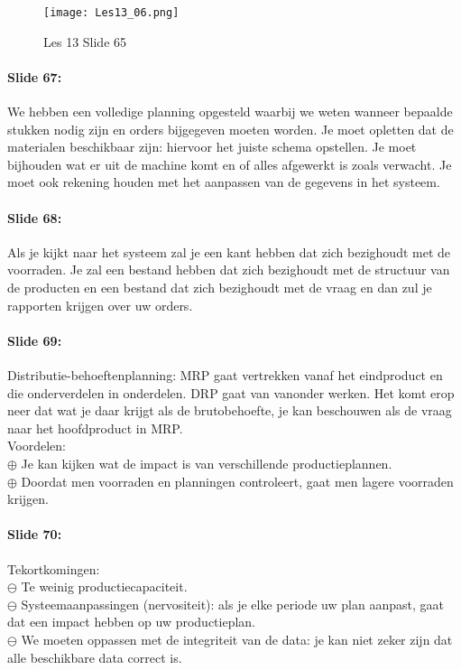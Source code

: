\documentclass[10pt,a4paper]{report}
\begin{document}
\begin{figure}[h!]
\centering
\texttt{[image: Les13\_06.png]}
\caption{Les 13 Slide 65} 
\label{les13_06}
\end{figure}

\paragraph{Slide 67:} We hebben een volledige planning opgesteld waarbij we weten wanneer bepaalde stukken nodig zijn en orders bijgegeven moeten worden. Je moet opletten dat de materialen beschikbaar zijn: hiervoor het juiste schema opstellen. Je moet bijhouden wat er uit de machine komt en of alles afgewerkt is zoals verwacht. Je moet ook rekening houden met het aanpassen van de gegevens in het systeem.

\paragraph{Slide 68:} Als je kijkt naar het systeem zal je een kant hebben dat zich bezighoudt met de voorraden. Je zal een bestand hebben dat zich bezighoudt met de structuur van de producten en een bestand dat zich bezighoudt met de vraag en dan zul je rapporten krijgen over uw orders.

\paragraph{Slide 69:} Distributie-behoeftenplanning: MRP gaat vertrekken vanaf het eindproduct en die onderverdelen in onderdelen. DRP gaat van vanonder werken. Het komt erop neer dat wat je daar krijgt als de brutobehoefte, je kan beschouwen als de vraag naar het hoofdproduct in MRP.\\
Voordelen:\\
$\oplus$ Je kan kijken wat de impact is van verschillende productieplannen.\\
$\oplus$ Doordat men voorraden en planningen controleert, gaat men lagere voorraden krijgen.

\paragraph{Slide 70:} Tekortkomingen:\\
$\ominus$ Te weinig productiecapaciteit.\\
$\ominus$ Systeemaanpassingen (nervositeit): als je elke periode uw plan aanpast, gaat dat een impact hebben op uw productieplan. \\
$\ominus$ We moeten oppassen met de integriteit van de data: je kan niet zeker zijn dat alle beschikbare data correct is.
\end{document}
